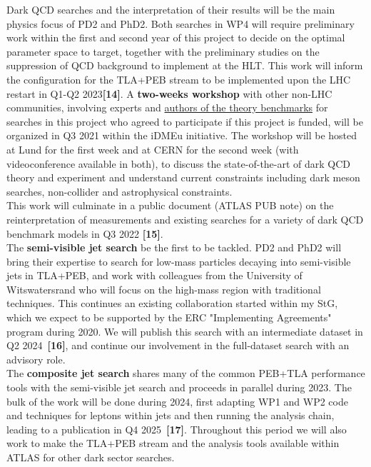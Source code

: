 Dark QCD searches and the interpretation of their results will be the main physics focus of PD2 and PhD2. 
Both searches in WP4 will require preliminary work within the first and second year of this project to decide on the optimal parameter space to target, 
together with the preliminary studies on the suppression of QCD background to implement at the HLT.
This work will inform the configuration for the TLA+PEB stream to be implemented upon the LHC restart in Q1-Q2 2023\textbf{[14]}. 
A \textbf{two-weeks workshop} with other non-LHC communities, involving experts and \href{https://p3h.particle.kit.edu/research/projects/b3a}{authors of the theory benchmarks} for searches in this project who agreed to participate if this project is funded, will be organized in Q3 2021 within the iDMEu initiative. 
The workshop will be hosted at Lund for the first week and at CERN for the second week (with videoconference available in both), to discuss the state-of-the-art of dark QCD theory and experiment and understand current constraints including dark meson searches, non-collider and astrophysical constraints. \\
This work will culminate in a public document (ATLAS PUB note) on the reinterpretation of measurements and existing searches for a variety of dark QCD benchmark models in Q3 2022 \textbf{[15]}. \\
The \textbf{semi-visible jet search} be the first to be tackled.
PD2 and PhD2 will bring their expertise to search for low-mass particles decaying into semi-visible jets in TLA+PEB, and work with colleagues from the University of Witswatersrand who will focus on the high-mass region with traditional techniques. 
This continues an existing collaboration started within my StG, which we expect to be supported by the ERC "Implementing Agreements" program during 2020.
We will publish this search with an intermediate dataset in Q2 2024~\textbf{[16]}, and continue our involvement in the full-dataset search with an advisory role. \\
The \textbf{composite jet search} shares many of the common PEB+TLA performance tools with the semi-visible jet search and proceeds in parallel during 2023. 
The bulk of the work will be done during 2024, first adapting WP1 and WP2 code and techniques for leptons within jets and then running the analysis chain, leading to a publication in Q4 2025~\textbf{[17]}. 
Throughout this period we will also work to make the TLA+PEB stream and the analysis tools available within ATLAS for other dark sector searches. 

